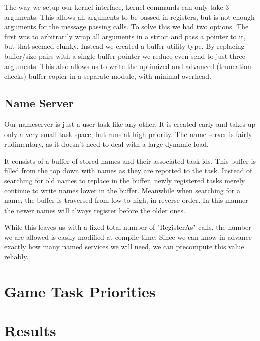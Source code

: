 \documentclass{article}
\begin{document}
The way we setup our kernel interface, kernel commands can only take 3
arguments. This allows all arguments to be passed in registers, but is not
enough arguments for the message passing calls. To solve this we had two
options. The first was to arbitrarily wrap all arguments in a struct and pass a
pointer to it, but that seemed clunky. Instead we created a buffer utility type.
By replacing buffer/size pairs with a single buffer pointer we reduce even send
to just three arguments. This also allows us to write the optimized and advanced
(truncation checks) buffer copier in a separate module, with minimal overhead.

\subsection*{Name Server}

Our nameserver is just a user task like any other. It is created early and takes
up only a very small task space, but runs at high priority. The name server is
fairly rudimentary, as it doesn't need to deal with a large dynamic load.

It consists of a buffer of stored names and their associated task ids. This
buffer is filled from the top down with names as they are reported to the task.
Instead of searching for old names to replace in the buffer, newly registered
tasks merely continue to write names lower in the buffer. Meanwhile when
searching for a name, the buffer is traversed from low to high, in reverse
order. In this manner the newer names will always register before the older
ones.

While this leaves us with a fixed total number of "RegisterAs" calls, the number
we are allowed is easily modified at compile-time. Since we can know in advance
exactly how many named services we will need, we can precompute this value
reliably.

\section*{Game Task Priorities}

\section*{Results}
\end{document}
